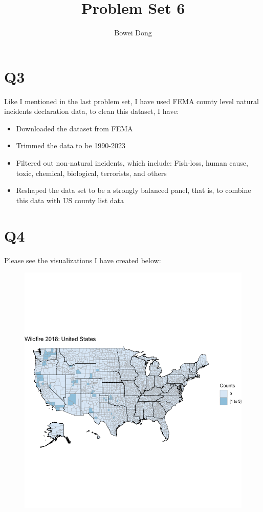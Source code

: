 \documentclass[letterpaper]{article}
\title{Problem Set 6}
\author{Bowei Dong }
\date{}
\begin{document}
\maketitle

\section*{Q3}

Like I mentioned in the last problem set, I have used FEMA county level natural incidents declaration data, to clean this dataset, I have:

\begin{itemize}
    \item Downloaded the dataset from FEMA
    \item Trimmed the data to be 1990-2023
    \item Filtered out non-natural incidents, which include: Fish-loss, human cause, toxic, chemical, biological, terrorists, and others
    \item Reshaped the data set to be a strongly balanced panel, that is, to combine this data with US county list data
\end{itemize}
\section*{Q4}
Please see the visualizations I have created below:
\begin{figure}[h]
  \caption{}
  \label{}
  \centering
    \includegraphics[width=1\textwidth]{PS6a_Dong.png}
\end{figure}
\end{document}
